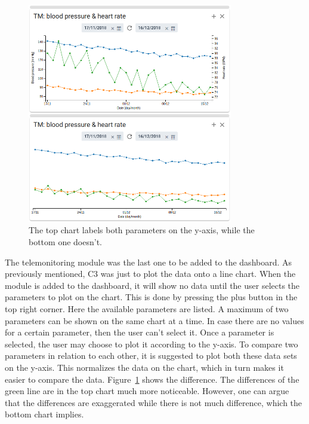             \begin{figure}[t]
                \centering
                \includegraphics[width=0.8\textwidth]{chapters/4_implementation/tm-compare}
                \caption{The top chart labels both parameters on the y-axis, while the bottom one doesn't.}\label{fig:tm-compare}
            \end{figure}

            The telemonitoring module was the last one to be added to the dashboard. As previously mentioned, C3 was just to plot the data onto a line chart. When the module is added to the dashboard, it will show no data until the user selects the parameters to plot on the chart. This is done by pressing the plus button in the top right corner. Here the available parameters are listed. A maximum of two parameters can be shown on the same chart at a time. In case there are no values for a certain parameter, then the user can't select it. Once a parameter is selected, the user may choose to plot it according to the y-axis. To compare two parameters in relation to each other, it is suggested to plot both these data sets on the y-axis. This normalizes the data on the chart, which in turn makes it easier to compare the data. Figure~\ref{fig:tm-compare} shows the difference. The differences of the green line are in the top chart much more noticeable. However, one can argue that the differences are exaggerated while there is not much difference, which the bottom chart implies.

